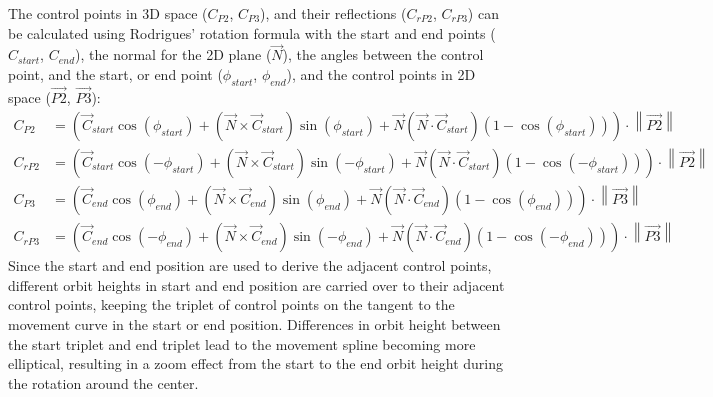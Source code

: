 The control points in 3D space ($C_{P2}$, $C_{P3}$), and their reflections ($C_{rP2}$, $C_{rP3}$) can be calculated
using Rodrigues' rotation formula with the start and end points ($C_{start}$, $C_{end}$), the normal for the 2D plane
($\vec{N}$), the angles between the control point, and the start, or end point ($\phi_{start}$, $\phi_{end}$), and the
control points in 2D space ($\overrightarrow{P2}$, $\overrightarrow{P3}$):
\begin{equation}
    \label{eq:control-point-transformation}
    \begin{aligned}
        C_{P2} &= \left(
            \vec{C}_{start} \cos(\phi_{start}) +
            ( \vec{N} \times \vec{C}_{start} )\sin(\phi_{start}) +
            \vec{N} ( \vec{N} \cdot \vec{C}_{start} )( 1 - \cos(\phi_{start}) )
        \right) \cdot \left\| \overrightarrow{P2} \right\|
        \\
        C_{rP2} &= \left(
            \vec{C}_{start} \cos(-\phi_{start}) +
            ( \vec{N} \times \vec{C}_{start} )\sin(-\phi_{start}) +
            \vec{N} ( \vec{N} \cdot \vec{C}_{start} )( 1 - \cos(-\phi_{start}) )
        \right) \cdot \left\| \overrightarrow{P2} \right\|
        \\
        C_{P3} &= \left(
            \vec{C}_{end} \cos(\phi_{end}) +
            ( \vec{N} \times \vec{C}_{end} )\sin(\phi_{end}) +
            \vec{N} ( \vec{N} \cdot \vec{C}_{end} )( 1 - \cos(\phi_{end}) )
        \right) \cdot \left\| \overrightarrow{P3} \right\|
        \\
        C_{rP3} &= \left(
            \vec{C}_{end} \cos(-\phi_{end}) +
            ( \vec{N} \times \vec{C}_{end} )\sin(-\phi_{end}) +
            \vec{N} ( \vec{N} \cdot \vec{C}_{end} )( 1 - \cos(-\phi_{end}) )
        \right) \cdot \left\| \overrightarrow{P3} \right\|
    \end{aligned}
\end{equation}
Since the start and end position are used to derive the adjacent control points, different orbit heights in start and
end position are carried over to their adjacent control points, keeping the triplet of control points on the tangent
to the movement curve in the start or end position.
Differences in orbit height between the start triplet and end triplet lead to the movement spline becoming more
elliptical, resulting in a zoom effect from the start to the end orbit height during the rotation around the center.

